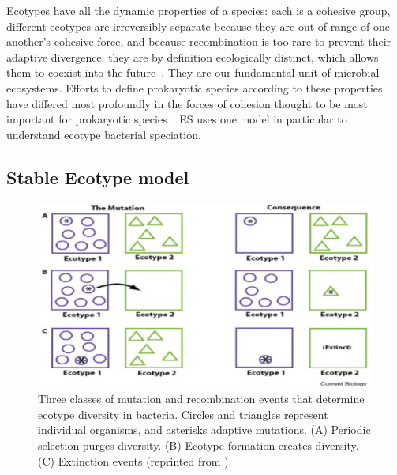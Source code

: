 Ecotypes have all the dynamic properties of a species: each is a cohesive group, different ecotypes are irreversibly separate because they are out of range of one another's cohesive force, and because recombination is too rare to prevent their adaptive divergence; they are by definition ecologically distinct, which allows them to coexist into the future~\cite{cohan2007systematics}.
They are our fundamental unit of microbial ecosystems.
Efforts to define prokaryotic species according to these properties have differed most profoundly in the forces of cohesion thought to be most important for prokaryotic species~\cite{cohan2008origins}.
ES uses one model in particular to understand ecotype bacterial speciation.

\subsection*{Stable Ecotype model}

\begin{figure}[h!]
 \centering
 \label{fig:StableEvents}
 \includegraphics{images/StableEcotypeEvents-CH2}
 \caption[Events predicted by the Stable Ecotype model.]{Three classes of mutation and recombination events that determine ecotype diversity in bacteria. Circles and triangles represent individual organisms, and asterisks adaptive mutations. (A) Periodic selection purges diversity. (B) Ecotype formation creates diversity. (C) Extinction events (reprinted from \protect\cite{cohan2007systematics}).}
 \label{fig:StableEvents}
\end{figure}

